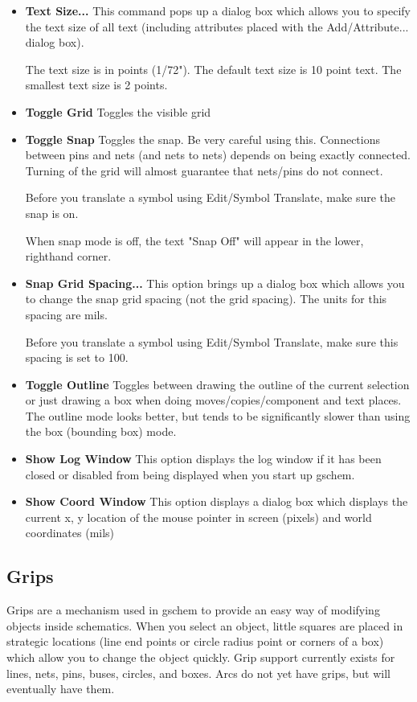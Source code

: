 \documentclass{article}
\begin{document}
\begin{itemize}
\item {\bf Text Size...}  This command pops up a dialog box which
  allows you to specify the text size of all text (including
  attributes placed with the Add/Attribute... dialog box).
  
  The text size is in points (1/72").  The default text size is 10
  point text.  The smallest text size is 2 points.
  
\item {\bf Toggle Grid} Toggles the visible grid
  
\item {\bf Toggle Snap} Toggles the snap.  Be very careful using this.
  Connections between pins and nets (and nets to nets) depends on
  being exactly connected.  Turning of the grid will almost guarantee
  that nets/pins do not connect.
  
  Before you translate a symbol using Edit/Symbol Translate, make sure
  the snap is on.
  
  When snap mode is off, the text "Snap Off" will appear in the lower,
  righthand corner.
  
\item {\bf Snap Grid Spacing...}  This option brings up a dialog box
  which allows you to change the snap grid spacing (not the grid
  spacing).  The units for this spacing are mils.
  
  Before you translate a symbol using Edit/Symbol Translate, make sure
  this spacing is set to 100.
  
\item {\bf Toggle Outline} Toggles between drawing the outline of the
  current selection or just drawing a box when doing
  moves/copies/component and text places.  The outline mode looks
  better, but tends to be significantly slower than using the box
  (bounding box) mode.
  
\item {\bf Show Log Window} This option displays the log window if it
  has been closed or disabled from being displayed when you start up
  gschem.
  
\item {\bf Show Coord Window} This option displays a dialog box which
  displays the current x, y location of the mouse pointer in screen
  (pixels) and world coordinates (mils)

\end{itemize}

\subsection{Grips}
Grips are a mechanism used in gschem to provide an easy way of
modifying objects inside schematics.  When you select an object,
little squares are placed in strategic locations (line end points or
circle radius point or corners of a box) which allow you to change the
object quickly.  Grip support currently exists for lines, nets, pins,
buses, circles, and boxes.  Arcs do not yet have grips, but will
eventually have them.
\end{document}

